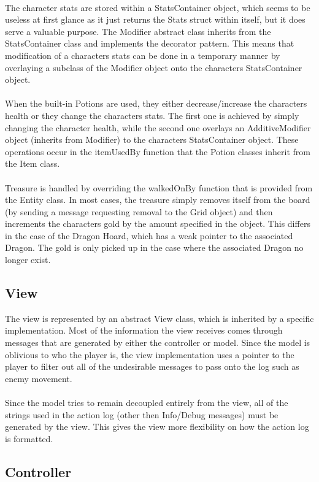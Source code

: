 \documentclass[12pt]{article}
\begin{document}
\\
The character stats are stored within a StatsContainer object, which seems to be useless at first glance as it just returns the Stats struct within itself, but it does serve a valuable purpose. The Modifier abstract class inherits from the StatsContainer class and implements the decorator pattern. This means that modification of a characters stats can be done in a temporary manner by overlaying a subclass of the Modifier object onto the characters StatsContainer object. \\
\\
When the built-in Potions are used, they either decrease/increase the characters health or they change the characters stats. The first one is achieved by simply changing the character health, while the second one overlays an AdditiveModifier object (inherits from Modifier) to the characters StatsContainer object. These operations occur in the itemUsedBy function that the Potion classes inherit from the Item class. \\
\\
Treasure is handled by overriding the walkedOnBy function that is provided from the Entity class. In most cases, the treasure simply removes itself from the board (by sending a message requesting removal to the Grid object) and then increments the characters gold by the amount specified in the object. This differs in the case of the Dragon Hoard, which has a weak pointer to the associated Dragon. The gold is only picked up in the case where the associated Dragon no longer exist.
\subsection*{View}

The view is represented by an abstract View class, which is inherited by a specific implementation. Most of the information the view receives comes through messages that are generated by either the controller or model. Since the model is oblivious to who the player is, the view implementation uses a pointer to the player to filter out all of the undesirable messages to pass onto the log such as enemy movement.\\
\\
Since the model tries to remain decoupled entirely from the view, all of the strings used in the action log (other then Info/Debug messages) must be generated by the view. This gives the view more flexibility on how the action log is formatted.

\subsection*{Controller}
\end{document}
